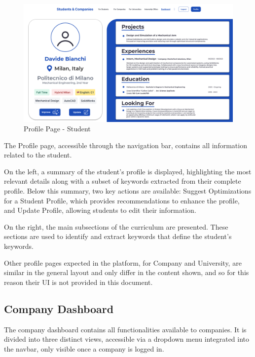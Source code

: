 \begin{figure} [H]
    \begin{center}
        \includegraphics[width=0.9\linewidth]{LaTeXCode/images/UI/Student Dashboard - Profile.png}
        \caption{Profile Page - Student}
        \label{fig: profile_student}
    \end{center}
\end{figure}

The Profile page, accessible through the navigation bar, contains all information related to the student.

On the left, a summary of the student’s profile is displayed, highlighting the most relevant details along with a subset of keywords extracted from their complete profile. Below this summary, two key actions are available: Suggest Optimizations for a Student Profile, which provides recommendations to enhance the profile, and Update Profile, allowing students to edit their information.

On the right, the main subsections of the curriculum are presented. These sections are used to identify and extract keywords that define the student's keywords.

Other profile pages expected in the platform, for Company and University, are similar in the general layout and only differ in the content shown, and so for this reason their UI is not provided in this document.

\subsection{Company Dashboard}
\label{subsec: company_dashboard}

The company dashboard contains all functionalities available to companies. It is divided into three distinct views, accessible via a dropdown menu integrated into the navbar, only visible once a company is logged in.

